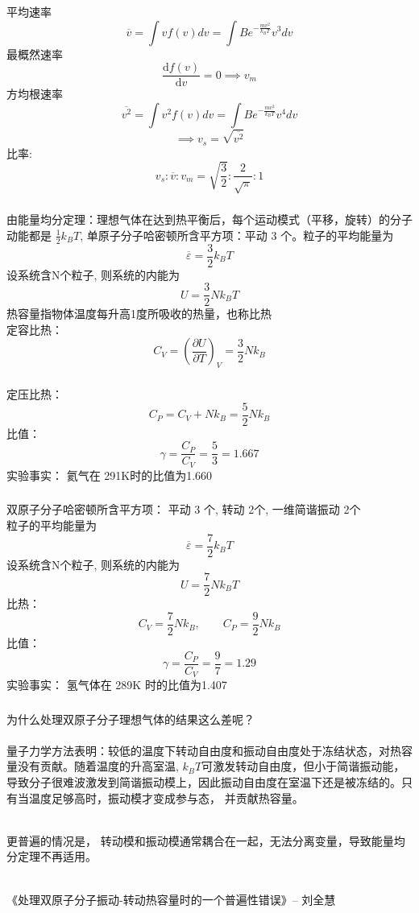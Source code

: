 \begin{frame}
  \frametitle{}
平均速率
\[ \overline{v} = \int v f(v) dv = \int B e^{- \frac{mv^2}{k_BT}} v^3 dv\]
最概然速率
\[ \frac{\mathrm{d}f(v)}{\mathrm{d} v}= 0 \implies v_{m} \]
方均根速率
\[ \overline{v^2} = \int v^2 f(v) dv = \int B e^{- \frac{mv^2}{k_BT}} v^4 dv\]
\[ \implies v_s = \sqrt{\overline{v^2}} \] 
比率:
\[ \boxed{v_s: \overline{v} : v_{m} = \sqrt{\frac{3}{2}} : \frac{2}{\sqrt{\pi}} : 1}  \]
\end{frame} 

\begin{frame}
  \frametitle{}
  \解 由能量均分定理：理想气体在达到热平衡后，每个运动模式（平移，旋转）的分子动能都是 $\frac{1}{2}k_BT$,
  单原子分子哈密顿所含平方项：平动 3 个。粒子的平均能量为
  \[ \overline{\varepsilon }  = \frac{3}{2}k_BT\]
  设系统含N个粒子, 则系统的内能为
  \[ U= \frac{3}{2} N k_BT\]
  热容量指物体温度每升高1度所吸收的热量，也称比热 \\
  定容比热： 
  \[ C_V = \left(\frac{\partial U}{\partial T }\right)_V = \frac{3}{2} N k_B\]
\end{frame} 

\begin{frame}
  \frametitle{}
  定压比热：
  \[ C_P = C_V + N k_B = \frac{5}{2} N k_B\] 
  比值： 
  \[\gamma = \frac{C_P}{C_V} = \frac{5}{3} = 1.667 \]
  实验事实： 氦气在 291K时的比值为1.660
\end{frame} 

\begin{frame}
  \frametitle{}
  \解 双原子分子哈密顿所含平方项： 平动 3 个, 转动 2个, 一维简谐振动 2个\\
  粒子的平均能量为
  \[ \overline{\varepsilon }  = \frac{7}{2}k_BT\]
  设系统含N个粒子, 则系统的内能为
  \[ U= \frac{7}{2} N k_BT\]
  比热： 
  \[ C_V = \frac{7}{2} N k_B, \qquad C_P = \frac{9}{2} N k_B\]  
  比值： 
  \[\gamma = \frac{C_P}{C_V} = \frac{9}{7} = 1.29 \]
  实验事实： 氢气体在 289K 时的比值为1.407
\end{frame} 

\begin{frame}[label=current]
  \frametitle{}
为什么处理双原子分子理想气体的结果这么差呢？ \\

~~\\
量子力学方法表明：较低的温度下转动自由度和振动自由度处于冻结状态，对热容量没有贡献。随着温度的升高室温, $k_B T$可激发转动自由度，但小于简谐振动能，导致分子很难波激发到简谐振动模上，因此振动自由度在室温下还是被冻结的。只有当温度足够高时，振动模才变成参与态， 并贡献热容量。 

~~\\
更普遍的情况是， 转动模和振动模通常耦合在一起，无法分离变量，导致能量均分定理不再适用。

~~\\
《处理双原子分子振动-转动热容量时的一个普遍性错误》-- 刘全慧
\end{frame} 

